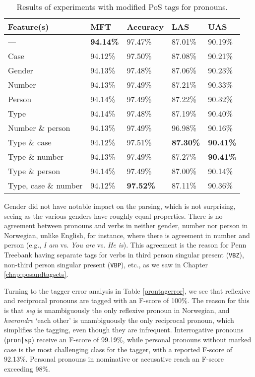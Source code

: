 \documentclass[a4paper,12pt,english]{book}
\begin{document}
\begin{table}
    \centering
    \smaller[0.5]
    \begin{tabular}{@{}lllll@{}}
        \toprule
        \textbf{Feature(s)} & \textbf{MFT} & \textbf{Accuracy} &
        \textbf{LAS} & \textbf{UAS} \\
        \midrule
        --- & \textbf{94.14\%} & 97.47\% & 87.01\% & 90.19\% \\
        Case & 94.12\% & 97.50\% & 87.08\% & 90.21\% \\
        Gender & 94.13\% & 97.48\% & 87.06\% & 90.23\% \\
        Number & 94.13\% & 97.49\% & 87.21\% & 90.33\% \\
        Person & 94.14\% & 97.49\% & 87.22\% & 90.32\% \\
        Type & 94.14\% & 97.48\% & 87.19\% & 90.40\% \\
        Number \& person & 94.13\% & 97.49\% & 96.98\% & 90.16\% \\
        Type \& case & 94.12\% & 97.51\% & \textbf{87.30\%} &
        \textbf{90.41\%} \\
        Type \& number & 94.13\% & 97.49\% & 87.27\% & \textbf{90.41\%} \\
        Type \& person & 94.14\% & 97.49\% & 87.00\% & 90.14\% \\
        Type, case \& number & 94.12\% & \textbf{97.52\%} & 87.11\% & 90.36\% \\
        \bottomrule
    \end{tabular}
    \caption{Results of experiments with modified PoS tags for pronouns.}
    \label{pronresults}
\end{table}

Gender did not have notable impact on the parsing, which is not surprising,
seeing as the various genders have roughly equal properties. There is no
agreement between pronouns and verbs in neither gender, number nor person in
Norwegian, unlike English, for instance, where there is agreement in number and
person (e.g., \emph{I am} vs. \emph{You are} vs. \emph{He is}). This
agreement is the reason for Penn Treebank having separate tags for verbs in
third person singular present (\texttt{VBZ}), non-third person singular present
(\texttt{VBP}), etc., as we saw in Chapter \ref{chap:posandtagsets}.

Turning to the tagger error analysis in Table \ref{prontagerror}, we see that
reflexive and reciprocal pronouns are tagged with an F-score of 100\%. The
reason for this is that \emph{seg} is unambiguously the only reflexive pronoun
in Norwegian, and \emph{hverandre} `each other' is unambiguously the only
reciprocal pronoun, which simplifies the tagging, even though they are
infrequent. Interrogative pronouns (\texttt{pron|sp}) receive an F-score of
99.19\%, while personal pronouns without marked case is the most challenging
class for the tagger, with a reported F-score of 92.13\%. Personal pronouns in
nominative or accusative reach an F-score exceeding 98\%.
\end{document}
